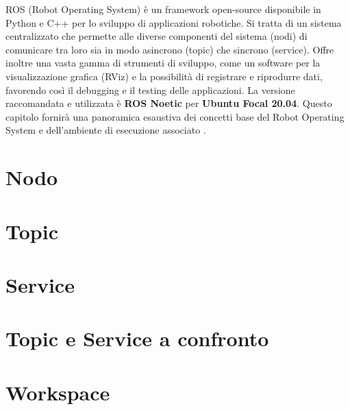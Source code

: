 ROS (Robot Operating System) \`{e} un framework open-source disponibile in Python e C++ per lo sviluppo di applicazioni robotiche. 
Si tratta di un sistema centralizzato che permette alle diverse componenti del sistema (nodi) di comunicare tra loro sia in modo
asincrono (topic) che sincrono (service). Offre inoltre una vasta gamma di strumenti di sviluppo, come un software per la 
visualizzazione grafica (RViz) e la possibilit\`{a} di registrare e riprodurre dati, favorendo cos\`{i} il debugging e il testing 
delle applicazioni. 
La versione raccomandata e utilizzata \`{e} \textbf{ROS Noetic} per \textbf{Ubuntu Focal 20.04}. 
Questo capitolo fornir\`{a} una panoramica esaustiva dei concetti base del Robot Operating System e dell'ambiente di esecuzione 
associato \cite{quigley2009ros}.

\section{Nodo}


\section{Topic}


\section{Service}


\section{Topic e Service a confronto}


\section{Workspace}
